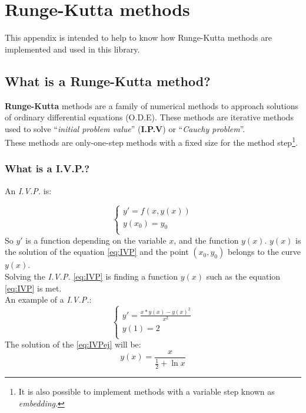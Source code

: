 %
%

\chapter{Runge-Kutta methods} \label{sec:Runge}

This appendix is intended to help to know how Runge-Kutta methods are implemented and used in this library.

\section{What is a Runge-Kutta method?}

\textbf{Runge-Kutta} methods are a family of numerical methods to approach solutions of ordinary differential equations (O.D.E). These methods are iterative methods used to solve ``\emph{initial problem value}'' (\textbf{I.P.V}) or ``\emph{Cauchy problem}''.\\

These methods are only-one-step methods with a fixed size for the method step\footnote{It is also possible to implement methods with a variable step known as \emph{embedding}.}.\\

\subsection{What is a I.V.P.?}

An \emph{I.V.P.} is:

\begin{equation} \label{eq:IVP}
\left\{ \begin{array}{l}
y' = f(x, y(x))\\
y(x_0) = y_0\\
\end{array} \right.
\end{equation}
%
So $y'$ is a function depending on the variable $x$, and the function $y(x)$. $y(x)$ is the solution of the equation \ref{eq:IVP} and the point $(x_0,y_0)$ belongs to the curve $y(x)$.\\

Solving the \emph{I.V.P.} \ref{eq:IVP} is finding a function $y(x)$ such as the equation \ref{eq:IVP} is met.\\

An example of a \emph{I.V.P.}:
%
\begin{equation} \label{eq:IVPej}
\left\{ \begin{array}{l}
y' = \frac{x * y(x) - y(x)^2}{x^2} \\
y(1) = 2 \\
\end{array} \right.
\end{equation}
%
The solution of the \ref{eq:IVPej} will be:
%
\begin{equation}
y(x) = \frac{x}{\frac{1}{2}+\ln x}
\end{equation}

